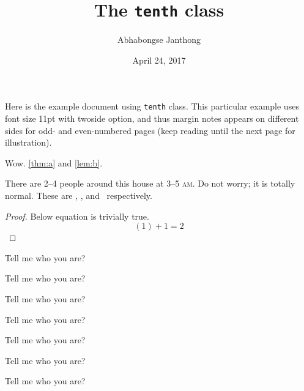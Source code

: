 \documentclass[11pt,twoside]{tenth}
\title{The \texttt{tenth} class}
\author{Abhabongse Janthong}
\date{April 24, 2017}
\begin{document}
    \maketitle

    Here is the example document using \texttt{tenth} class. This particular example uses font size 11pt with twoside option, and thus margin notes  appears on different sides for odd- and even-numbered pages (keep reading until the next page for illustration).

    Wow. \autoref{thm:a} and \autoref{lem:b}. \lemmaautorefname

    \lipsum[1-5]

    There are 2--4 people around this house at 3--5 \textsc{am}.  Do not worry; it is totally normal. These are \redsq, \greensq, and \bluesq\ respectively.

    \begin{proof}
        Below equation is trivially true.
        \begin{equation}
            (1) + 1 = 2
        \end{equation}
    \end{proof}

    \begin{question}
        Tell me who you are?
    \end{question}
    \unskip
    \begin{definition}
        Tell me who you are?
    \end{definition}
    \unskip
    \begin{theorem}
        \label{thm:a}
        Tell me who you are?

        \lipsum[1-4]
    \end{theorem}
    \unskip
    \begin{lemma}[likeme]
        \label{lem:b}
        Tell me who you are?
    \end{lemma}
    \begin{claim}
        \label{clm:c}
        Tell me who you are?
    \end{claim}
    \begin{remark}
        Tell me who you are?
    \end{remark}
    \begin{note}
        Tell me who you are?
    \end{note}
\end{document}
